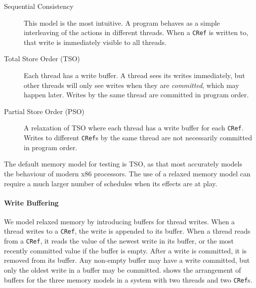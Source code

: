 \begin{description}
\item[Sequential Consistency] This model is the most intuitive.  A program
  behaves as a simple interleaving of the actions in different threads.  When a
  \texttt{CRef} is written to, that write is immediately visible to all
  threads.

\item[Total Store Order (TSO)] Each thread has a write buffer.  A thread sees
  its writes immediately, but other threads will only see writes when they are
  \emph{committed}, which may happen later.  Writes by the same thread are
  committed in program order.

\item[Partial Store Order (PSO)] A relaxation of TSO where each thread has a
  write buffer for each \verb|CRef|.  Writes to different \verb|CRef|s by the
  same thread are not necessarily committed in program order.
\end{description}

The default memory model for testing is TSO, as that most accurately models the
behaviour of modern x86 processors\cite{owens2009}.  The use of a relaxed memory
model can require a much larger number of schedules when its effects are at
play.

\paragraph{Write Buffering}
We model relaxed memory by introducing buffers for thread writes.  When a thread
writes to a \verb|CRef|, the write is appended to its buffer.  When a thread
reads from a \verb|CRef|, it reads the value of the newest write in its buffer,
or the most recently committed value if the buffer is empty.  After a write is
committed, it is removed from its buffer.  Any non-empty buffer may have a write
committed, but only the oldest write in a buffer may be committed.  
shows the arrangement of buffers for the three memory models in a system with
two threads and two \verb|CRef|s.

